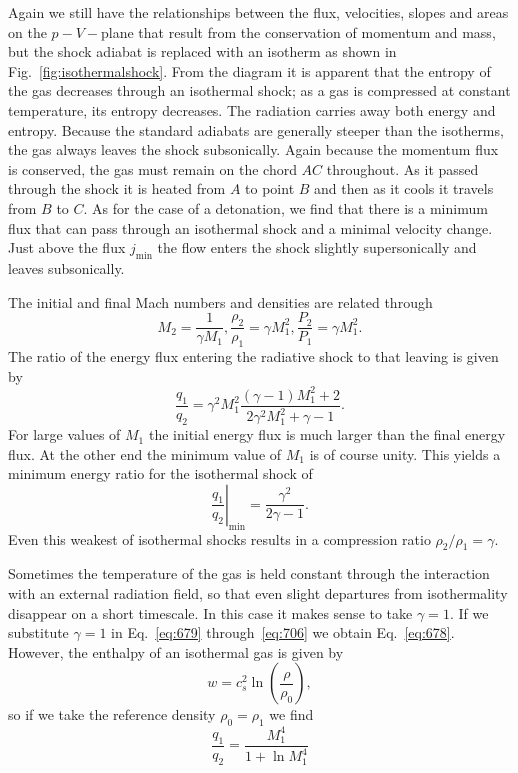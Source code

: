 Again we still have the relationships between the flux, velocities,
slopes and areas on the $p-V-$plane that result from the conservation
of momentum and mass, but the shock adiabat is replaced with an
isotherm as shown in Fig.~\ref{fig:isothermalshock}.  From the diagram
it is apparent that the entropy of the gas decreases through an
isothermal shock; as a gas is compressed at constant temperature, its
entropy decreases.  The radiation carries away both energy and
entropy.  Because the standard adiabats are generally steeper than the
isotherms, the gas always leaves the shock subsonically.  Again
because the momentum flux is conserved, the gas must remain on the
chord $AC$ throughout.   As it passed through the shock it is heated
from $A$ to point $B$ and then as it cools it travels from $B$ to $C$.
As for the case of a detonation, we find that there is a minimum flux
that can pass through an isothermal shock and a minimal velocity
change.  Just above the flux $j_\mathrm{min}$ the flow enters the
shock slightly supersonically and leaves subsonically.

The initial and final Mach numbers and densities are related through
\begin{equation}
M_2 = \frac{1}{\gamma M_1}, \frac{\rho_2}{\rho_1} = \gamma M_1^2, \frac{P_2}{P_1} = \gamma M_1^2.
\label{eq:678}
\end{equation}
The ratio of the energy flux entering the radiative shock to that
leaving is given by
\begin{equation}
\frac{q_1}{q_2} = \gamma^2 M_1^2 \frac{(\gamma-1) M_1^2 + 2}{2 \gamma^2
  M_1^2 + \gamma - 1}.
\end{equation}
For large values of $M_1$ the initial energy flux is much larger than
the final energy flux.  At the other end the minimum value of $M_1$ is
of course unity. This yields a minimum energy ratio for the isothermal
shock of
\begin{equation}
\left .  \frac{q_1}{q_2} \right |_\mathrm{min} = \frac{\gamma^2}{2
  \gamma -1}.
\end{equation}
Even this weakest of isothermal shocks results in a compression ratio
$\rho_2/\rho_1 = \gamma$.

Sometimes the temperature of the gas is held constant through the
interaction with an external radiation field, so that even slight
departures from isothermality disappear on a short timescale.  In this
case it makes sense to take $\gamma=1$.   If we substitute $\gamma=1$
in Eq.~\ref{eq:679} through~\ref{eq:706} we obtain Eq.~\ref{eq:678}.
However, the enthalpy of an isothermal gas is given by
\begin{equation}
  w = c_s^2 \ln \left ( \frac{\rho}{\rho_0} \right ),
\end{equation}
so if we take the reference density $\rho_0=\rho_1$ we find
\begin{equation}
\frac{q_1}{q_2} = \frac{M_1^4}{1+\ln M_1^4}
\label{eq:757}
\end{equation}

